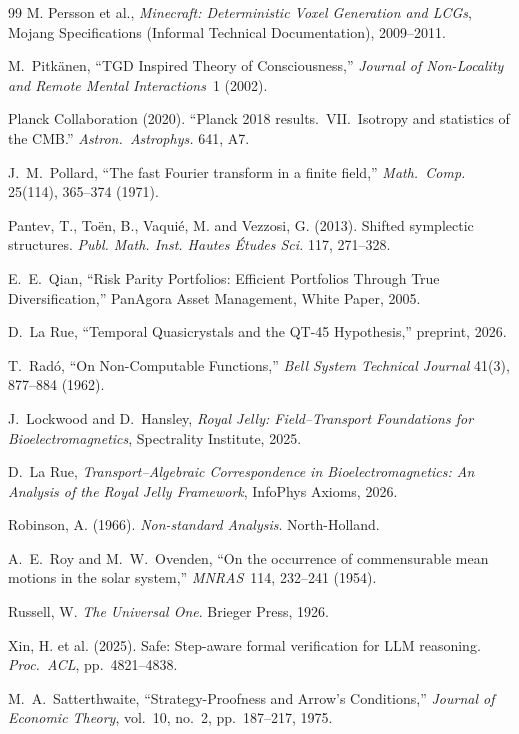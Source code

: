 \documentclass[12pt,oneside]{book}
\theoremstyle{principia}
\theoremstyle{definition}
\theoremstyle{remark}
\begin{document}
\begin{thebibliography}{99}
M. Persson et al.,
\textit{Minecraft: Deterministic Voxel Generation and LCGs},
Mojang Specifications (Informal Technical Documentation), 2009--2011.

M.~Pitk\"anen, ``TGD Inspired Theory of Consciousness,'' \emph{Journal of Non-Locality and Remote Mental Interactions}\ 1 (2002).

Planck Collaboration (2020).
``Planck 2018 results.\ VII.\ Isotropy and statistics of the CMB.''
\textit{Astron.\ Astrophys.} 641, A7.

J.~M.~Pollard,
``The fast Fourier transform in a finite field,''
\emph{Math.\ Comp.} 25(114), 365--374 (1971).

Pantev, T., To\"en, B., Vaqui\'e, M. and Vezzosi, G. (2013). Shifted symplectic structures. \emph{Publ. Math. Inst. Hautes \'Etudes Sci.} 117, 271--328.

E.~E.~Qian,
``Risk Parity Portfolios: Efficient Portfolios Through True Diversification,''
PanAgora Asset Management, White Paper, 2005.

D.~La Rue,
``Temporal Quasicrystals and the QT-45 Hypothesis,''
preprint, 2026.

T.~Rad\'o,
``On Non-Computable Functions,''
\emph{Bell System Technical Journal} 41(3), 877--884 (1962).

J.~Lockwood and D.~Hansley, \emph{Royal Jelly: Field--Transport Foundations for Bioelectromagnetics}, Spectrality Institute, 2025.

D.~La Rue, \emph{Transport--Algebraic Correspondence in Bioelectromagnetics: An Analysis of the Royal Jelly Framework}, InfoPhys Axioms, 2026.

Robinson, A. (1966). \emph{Non-standard Analysis}. North-Holland.

A.~E.~Roy and M.~W.~Ovenden, ``On the occurrence of commensurable mean motions in the solar system,'' \emph{MNRAS}\ 114, 232--241 (1954).

Russell, W.
\newblock \emph{The Universal One}.
\newblock Brieger Press, 1926.

Xin, H. et al. (2025). Safe: Step-aware formal verification for LLM reasoning. \emph{Proc.\ ACL}, pp.~4821--4838.

M.~A.~Satterthwaite,
``Strategy-Proofness and Arrow's Conditions,''
\emph{Journal of Economic Theory}, vol.~10, no.~2, pp.~187--217, 1975.


\end{thebibliography}
\end{document}
